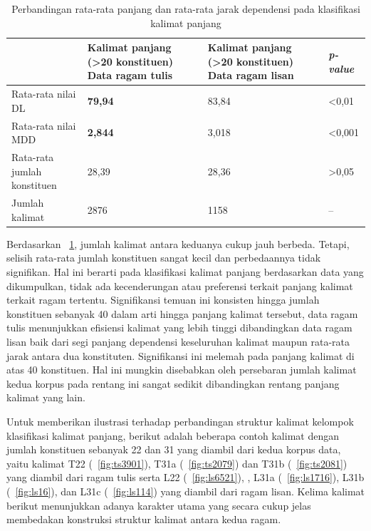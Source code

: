 \begin{table}
\begin{center}
\begin{small}
\caption{Perbandingan rata-rata panjang dan rata-rata jarak dependensi pada klasifikasi kalimat panjang}  \label{tab:DL_MDD_panjang}
\begin{tabular}{ | p{3.2cm} | p{3.2cm} | p{3.2cm} | p{2cm} |}
    \hline
 & Kalimat panjang \newline (\textgreater20 konstituen) \newline Data ragam tulis & Kalimat panjang \newline (\textgreater20 konstituen) \newline Data ragam lisan & \textit{p-value} \\ \hline
 Rata-rata nilai DL & \textbf{79,94} & 83,84 & \textless 0,01 \\ \hline
 Rata-rata nilai MDD & \textbf{2,844} & 3,018 & \textless 0,001 \\ \hline
 Rata-rata jumlah konstituen & 28,39 & 28,36 & \textgreater 0,05 \\ \hline
 Jumlah kalimat & 2876 & 1158 & -- \\ \hline
   \end{tabular}
   \end{small}
\end{center}
\end{table}

Berdasarkan \tab~\ref{tab:DL_MDD_panjang}, jumlah kalimat antara keduanya cukup jauh berbeda. Tetapi, selisih rata-rata jumlah konstituen sangat kecil dan perbedaannya tidak signifikan. Hal ini berarti pada klasifikasi kalimat panjang berdasarkan data yang dikumpulkan, tidak ada kecenderungan atau preferensi terkait panjang kalimat terkait ragam tertentu. Signifikansi temuan ini konsisten hingga jumlah konstituen sebanyak 40 dalam arti hingga panjang kalimat tersebut, data ragam tulis menunjukkan efisiensi kalimat yang lebih tinggi dibandingkan data ragam lisan baik dari segi panjang dependensi keseluruhan kalimat maupun rata-rata jarak antara dua konstituten. Signifikansi ini melemah pada panjang kalimat di atas 40 konstituen. Hal ini mungkin disebabkan oleh persebaran jumlah kalimat kedua korpus pada rentang ini sangat sedikit dibandingkan rentang panjang kalimat yang lain.  

Untuk memberikan ilustrasi terhadap perbandingan struktur kalimat kelompok klasifikasi kalimat panjang, berikut adalah beberapa contoh kalimat dengan jumlah konstituen sebanyak 22 dan 31 yang diambil dari kedua korpus data, yaitu kalimat T22 (\pic~\ref{fig:ts3901}), T31a (\pic~\ref{fig:ts2079}) dan T31b (\pic~\ref{fig:ts2081}) yang diambil dari ragam tulis serta L22 (\pic~\ref{fig:ls6521}), , L31a (\pic~\ref{fig:ls1716}), L31b (\pic~\ref{fig:ls16}), dan L31c (\pic~\ref{fig:ls114}) yang diambil dari ragam lisan. Kelima kalimat berikut menunjukkan adanya karakter utama yang secara cukup jelas membedakan konstruksi struktur kalimat antara kedua ragam. 

